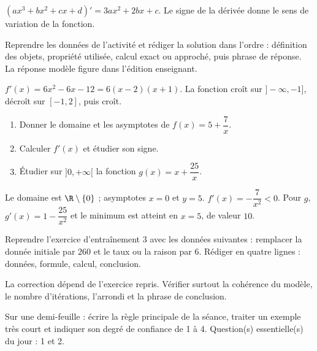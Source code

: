 \begin{summary}$(ax^3+bx^2+cx+d)'=3ax^2+2bx+c$. Le signe de la dérivée donne le sens de variation de la fonction.\end{summary}

\begin{example}
Reprendre les données de l'activité et rédiger la solution dans l'ordre : définition des objets, propriété utilisée, calcul exact ou approché, puis phrase de réponse. La réponse modèle figure dans l'édition enseignant.
\end{example}
\begin{solution}$f'(x)=6x^2-6x-12=6(x-2)(x+1)$. La fonction croît sur $]-\infty,-1]$, décroît sur $[-1,2]$, puis croît.\end{solution}

\begin{exercise}[essentiel]
\begin{enumerate}\item Donner le domaine et les asymptotes de $f(x)=5+\dfrac{7}x$.\item Calculer $f'(x)$ et étudier son signe.\item Étudier sur $]0,+\infty[$ la fonction $g(x)=x+\dfrac{25}x$.\end{enumerate}
\end{exercise}
\begin{solution}Le domaine est $\R\setminus\{0\}$ ; asymptotes $x=0$ et $y=5$. $f'(x)=-\dfrac{7}{x^2}<0$. Pour $g$, $g'(x)=1-\dfrac{25}{x^2}$ et le minimum est atteint en $x=5$, de valeur $10$.\end{solution}


\begin{homework}Reprendre l'exercice d'entraînement 3 avec les données suivantes : remplacer la donnée initiale par $260$ et le taux ou la raison par $6$. Rédiger en quatre lignes : données, formule, calcul, conclusion.\end{homework}
\begin{solution}La correction dépend de l'exercice repris. Vérifier surtout la cohérence du modèle, le nombre d'itérations, l'arrondi et la phrase de conclusion.\end{solution}

\begin{exitticket}[3 minutes]Sur une demi-feuille : écrire la règle principale de la séance, traiter un exemple très court et indiquer son degré de confiance de 1 à 4. Question(s) essentielle(s) du jour : 1 et 2.\end{exitticket}

